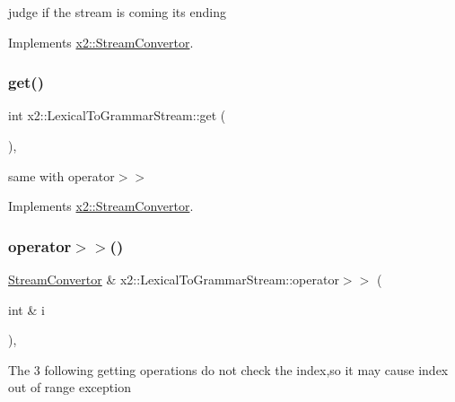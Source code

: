 judge if the stream is coming its ending 

Implements \hyperlink{classx2_1_1_stream_convertor_a64febc08c310555497ca497df583b940}{x2\+::\+Stream\+Convertor}.

\mbox{\label{classx2_1_1_lexical_to_grammar_stream_a8ae8e1b6ada26785c70db1255daca798}} 
\subsubsection{\texorpdfstring{get()}{get()}}
{\footnotesize\ttfamily int x2\+::\+Lexical\+To\+Grammar\+Stream\+::get (\begin{DoxyParamCaption}{ }\end{DoxyParamCaption})\hspace{0.3cm}{\ttfamily [inline]}, {\ttfamily [virtual]}}

same with operator$>$$>$ 

Implements \hyperlink{classx2_1_1_stream_convertor_a1025f8d8b1b1e430a6476d74e2506b10}{x2\+::\+Stream\+Convertor}.

\mbox{\label{classx2_1_1_lexical_to_grammar_stream_a7b3d4b7bfc44a17905bae8dc8dcf7a40}} 
\subsubsection{\texorpdfstring{operator$>$$>$()}{operator>>()}}
{\footnotesize\ttfamily \hyperlink{classx2_1_1_stream_convertor}{Stream\+Convertor} \& x2\+::\+Lexical\+To\+Grammar\+Stream\+::operator$>$$>$ (\begin{DoxyParamCaption}\item[{int \&}]{i }\end{DoxyParamCaption})\hspace{0.3cm}{\ttfamily [inline]}, {\ttfamily [virtual]}}

The 3 following getting operations do not check the index,so it may cause index out of range exception 

